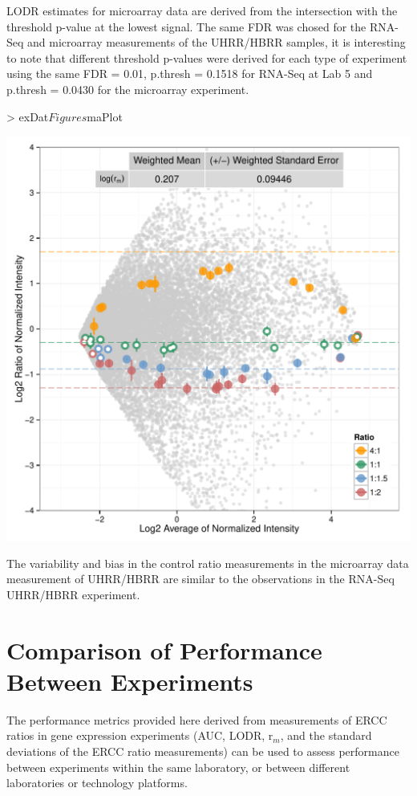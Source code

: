 \documentclass{article}
\begin{document}
LODR estimates for microarray data are derived from the intersection with the 
threshold p-value at the lowest signal. The same FDR was chosed for the RNA-Seq 
and microarray measurements of the UHRR/HBRR samples, it is interesting to note 
that different threshold p-values were derived for each type of experiment using
the same FDR = 0.01, p.thresh = 0.1518 for RNA-Seq at Lab 5 and 
p.thresh = 0.0430 for the microarray experiment.
\clearpage
\begin{center}
\begin{Schunk}
\begin{Sinput}
> exDat$Figures$maPlot
\end{Sinput}
\end{Schunk}
\includegraphics{erccdashboardVignette-seqcArrayPlotD}
\end{center}

The variability and bias in the control ratio measurements 
in the microarray data measurement of UHRR/HBRR are similar to the observations in
the RNA-Seq UHRR/HBRR experiment.

\section{Comparison of Performance Between Experiments}
The performance metrics provided here derived from measurements of ERCC ratios in
gene expression experiments (AUC, LODR, r$_m$, and the standard deviations of 
the ERCC ratio measurements) can be used to assess performance between experiments within
the same laboratory, or between different laboratories or technology platforms.
\end{document}
